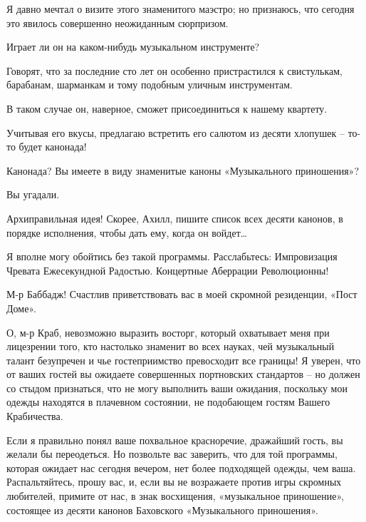 \documentclass[../main.tex]{subfiles}
\begin{document}
\begin{dialogue}
 Я давно мечтал о визите этого знаменитого маэстро; но признаюсь, что сегодня это явилось совершенно неожиданным сюрпризом.

 Играет ли он на каком-нибудь музыкальном инструменте?

 Говорят, что за последние сто лет он особенно пристрастился к свистулькам, барабанам, шарманкам и тому подобным уличным инструментам.

 В таком случае он, наверное, сможет присоединиться к нашему квартету.

 Учитывая его вкусы, предлагаю встретить его салютом из десяти хлопушек \--- то-то будет канонада!

 Канонада? Вы имеете в виду знаменитые каноны «Музыкального приношения»?

 Вы угадали.

 Архиправильная идея! Скорее, Ахилл, пишите список всех десяти канонов, в порядке исполнения, чтобы дать ему, когда он войдет\ldots{}


 Я вполне могу обойтись без такой программы. Расслабьтесь: Импровизация Чревата Ежесекундной Радостью. Концертные Аберрации Революционны!

 М-р Баббадж! Счастлив приветствовать вас в моей скромной резиденции, «Пост Доме».

 О, м-р Краб, невозможно выразить восторг, который охватывает меня при лицезрении того, кто настолько знаменит во всех науках, чей музыкальный талант безупречен и чье гостеприимство превосходит все границы! Я уверен, что от ваших гостей вы ожидаете совершенных портновских стандартов \--- но должен со стыдом признаться, что не могу выполнить ваши ожидания, поскольку мои одежды находятся в плачевном состоянии, не подобающем гостям Вашего Крабичества.

 Если я правильно понял ваше похвальное красноречие, дражайший гость, вы желали бы переодеться. Но позвольте вас заверить, что для той программы, которая ожидает нас сегодня вечером, нет более подходящей одежды, чем ваша. Распальтяйтесь, прошу вас, и, если вы не возражаете против игры скромных любителей, примите от нас, в знак восхищения, «музыкальное приношение», состоящее из десяти канонов Баховского «Музыкального приношения».


\end{dialogue}
\end{document}
